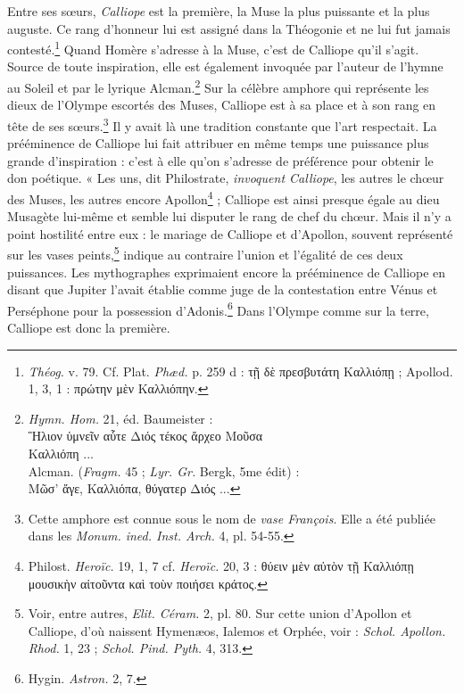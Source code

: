 \documentclass[a4paper, 11pt, oneside, polutonikogreek, french]{article}
\begin{document}
Entre ses sœurs, \emph{Calliope} est la première, la Muse la plus puissante et la plus auguste. Ce rang d'honneur lui est assigné dans la Théogonie et ne lui fut jamais contesté.\footnote{\emph{Théog.} v. 79. Cf. Plat. \emph{Phæd.} p. 259 d : τῇ δὲ πρεσβυτάτη Καλλιόπῃ ; Apollod. 1, 3, 1 : πρώτην μὲν Καλλιόπην.} Quand Homère s'adresse à la Muse, c'est de Calliope qu'il s'agit. Source de toute inspiration, elle est également invoquée par l'auteur de l'hymne au Soleil et par le lyrique Alcman.\footnote{\emph{Hymn. Hom.} 21, éd. Baumeister :\\\hspace*{10mm}Ἣλιον ὑμνεῖν αὗτε Διός τέκος ἄρχεο Μοῦσα\\\hspace*{10mm}Καλλιόπη ...\\\hspace*{5mm}Alcman. (\emph{Fragm.} 45 ; \emph{Lyr. Gr.} Bergk, 5me édit) :\\\hspace*{10mm}Μῶσ' ἄγε, Καλλιόπα, θύγατερ Διός ...} Sur la célèbre amphore qui représente les dieux de l'Olympe escortés des Muses, Calliope est à sa place et à son rang en tête de ses sœurs.\footnote{Cette amphore est connue sous le nom de \emph{vase François}. Elle a été publiée dans les \emph{Monum. ined. Inst. Arch.} 4, pl. 54-55.} Il y avait là une tradition constante que l'art respectait. La prééminence de Calliope lui fait attribuer en même temps une puissance plus grande d'inspiration : c'est à elle qu'on s'adresse de préférence pour obtenir le don poétique. « Les uns, dit Philostrate, \emph{invoquent Calliope}, les autres le chœur des Muses, les autres encore Apollon\footnote{Philost. \emph{Heroïc.} 19, 1, 7 cf. \emph{Heroïc.} 20, 3 : θύειν μὲν αὐτὸν τῇ Καλλιόπῃ μουσικὴν αἰτοῦντα καὶ τοὺν ποιήσει κράτος.} ; Calliope est ainsi presque égale au dieu Musagète lui-même et semble lui disputer le rang de chef du chœur. Mais il n'y a point hostilité entre eux : le mariage de Calliope et d'Apollon, souvent représenté sur les vases peints,\footnote{Voir, entre autres, \emph{Elit. Céram.} 2, pl. 80. Sur cette union d'Apollon et Calliope, d'où naissent Hymenæos, Ialemos et Orphée, voir : \emph{Schol. Apollon. Rhod.} 1, 23 ; \emph{Schol. Pind. Pyth.} 4, 313.} indique au contraire l'union et l'égalité de ces deux puissances. Les mythographes exprimaient encore la prééminence de Calliope en disant que Jupiter l'avait établie comme juge de la contestation entre Vénus et Perséphone pour la possession d'Adonis.\footnote{Hygin. \emph{Astron.} 2, 7.} Dans l'Olympe comme sur la terre, Calliope est donc la première.
\end{document}
